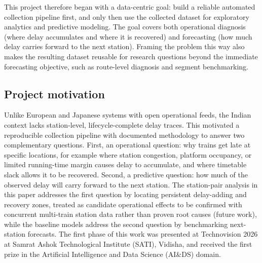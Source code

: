 \documentclass[a4paper,fleqn]{cas-dc}
\begin{document}
This project therefore began with a data-centric goal: build a reliable
automated collection pipeline first, and only then use the collected dataset
for exploratory analytics and predictive modeling. The goal covers both
operational diagnosis (where delay accumulates and where it is recovered) and
forecasting (how much delay carries forward to the next station). Framing the
problem this way also makes the resulting dataset reusable for research
questions beyond the immediate forecasting objective, such as route-level
diagnosis and segment benchmarking.

\subsection{Project motivation}
Unlike European and Japanese systems with open operational feeds, the Indian
context lacks station-level, lifecycle-complete delay traces. This motivated
a reproducible collection pipeline with documented methodology to answer two
complementary questions. First, an operational question: why trains get late
at specific locations, for example where station congestion, platform
occupancy, or limited running-time margin causes delay to accumulate, and
where timetable slack allows it to be recovered. Second, a predictive
question: how much of the observed delay will carry forward to the next
station. The station-pair analysis in this paper addresses the first question
by locating persistent delay-adding and recovery zones, treated as candidate
operational effects to be confirmed with concurrent multi-train station data
rather than proven root causes (future work), while the baseline models
address the second question by benchmarking
next-station forecasts. The first phase of this work was presented at
Technovision 2026 at Samrat Ashok Technological Institute (SATI), Vidisha,
and received the first prize in the Artificial Intelligence and Data Science
(AI\&DS) domain.
\end{document}
